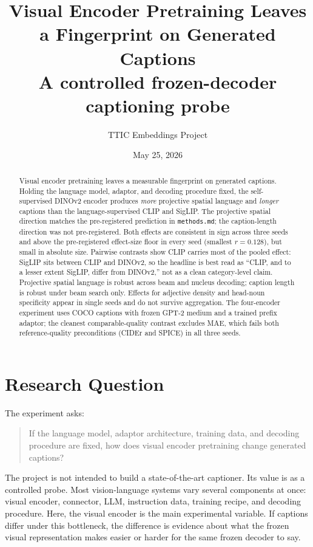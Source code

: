 \documentclass[11pt]{article}
\title{\textbf{Visual Encoder Pretraining Leaves a Fingerprint on Generated Captions}\\
\large A controlled frozen-decoder captioning probe}
\author{TTIC Embeddings Project}
\date{May 25, 2026}
\newcommand{\code}[1]{\texttt{#1}}
\begin{document}
\maketitle

\begin{abstract}
Visual encoder pretraining leaves a measurable fingerprint on generated
captions. Holding the language model, adaptor, and decoding procedure
fixed, the self-supervised DINOv2 encoder produces \emph{more} projective
spatial language and \emph{longer} captions than the language-supervised
CLIP and SigLIP. The projective spatial direction matches the pre-registered
prediction in \code{methods.md}; the caption-length direction was not
pre-registered. Both effects are consistent in sign across three seeds
and above the pre-registered effect-size floor in every seed (smallest
\(r=0.128\)), but small in absolute size. Pairwise contrasts show CLIP
carries most of the pooled effect: SigLIP sits between CLIP and DINOv2,
so the headline is best read as ``CLIP, and to a lesser extent SigLIP,
differ from DINOv2,'' not as a clean category-level claim. Projective
spatial language is robust across beam and nucleus decoding; caption
length is robust under beam search only. Effects for adjective density
and head-noun specificity appear in single seeds and do not survive
aggregation. The four-encoder experiment uses COCO captions with frozen
GPT-2 medium and a trained prefix adaptor; the cleanest comparable-quality
contrast excludes MAE, which fails both reference-quality preconditions
(CIDEr and SPICE) in all three seeds.
\end{abstract}

\section{Research Question}

The experiment asks:

\begin{quote}
If the language model, adaptor architecture, training data, and decoding
procedure are fixed, how does visual encoder pretraining change generated
captions?
\end{quote}

The project is not intended to build a state-of-the-art captioner. Its value is
as a controlled probe. Most vision-language systems vary several components at
once: visual encoder, connector, LLM, instruction data, training recipe, and
decoding procedure. Here, the visual encoder is the main experimental variable.
If captions differ under this bottleneck, the difference is evidence about what
the frozen visual representation makes easier or harder for the same frozen
decoder to say.
\end{document}
